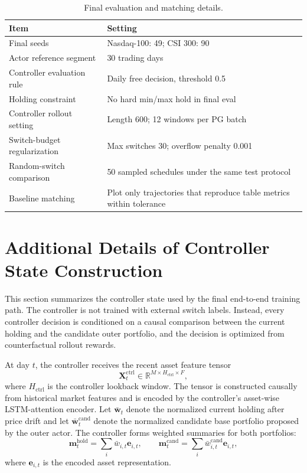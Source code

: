 \documentclass[letterpaper]{article} %
\begin{document}
\begin{table}[H]
\centering
\caption{Final evaluation and matching details.}
\label{tab:eval_protocol}
\footnotesize
\setlength{\tabcolsep}{3pt}
\begin{tabular}{p{}p{}}
\toprule
\textbf{Item} & \textbf{Setting} \\
\midrule
Final seeds & Nasdaq-100: 49; CSI 300: 90 \\
Actor reference segment & 30 trading days \\
Controller evaluation rule & Daily free decision, threshold 0.5 \\
Holding constraint & No hard min/max hold in final eval \\
Controller rollout setting & Length 600; 12 windows per PG batch \\
Switch-budget regularization & Max switches 30; overflow penalty 0.001 \\
Random-switch comparison & 50 sampled schedules under the same test protocol \\
Baseline matching & Plot only trajectories that reproduce table metrics within tolerance \\
\bottomrule
\end{tabular}
\end{table}

\section{Additional Details of Controller State Construction}
\label{app:ctrl_state}

This section summarizes the controller state used by the final end-to-end training path. The controller is not trained with external switch labels. Instead, every controller decision is conditioned on a causal comparison between the current holding and the candidate outer portfolio, and the decision is optimized from counterfactual rollout rewards.

At day \(t\), the controller receives the recent asset feature tensor
\[
\mathbf{X}^{\mathrm{ctrl}}_t
\in
\mathbb{R}^{M\times H_{\mathrm{ctrl}}\times F},
\]
where \(H_{\mathrm{ctrl}}\) is the controller lookback window. The tensor is constructed causally from historical market features and is encoded by the controller's asset-wise LSTM-attention encoder. Let \(\bar{\mathbf{w}}_t\) denote the normalized current holding after price drift and let \(\bar{\mathbf{w}}^{\mathrm{cand}}_t\) denote the normalized candidate base portfolio proposed by the outer actor. The controller forms weighted summaries for both portfolios:
\[
\mathbf{m}^{\mathrm{hold}}_t
=
\sum_i \bar{w}_{i,t}\mathbf{e}_{i,t},
\qquad
\mathbf{m}^{\mathrm{cand}}_t
=
\sum_i \bar{w}^{\mathrm{cand}}_{i,t}\mathbf{e}_{i,t},
\]
where \(\mathbf{e}_{i,t}\) is the encoded asset representation.
\end{document}
